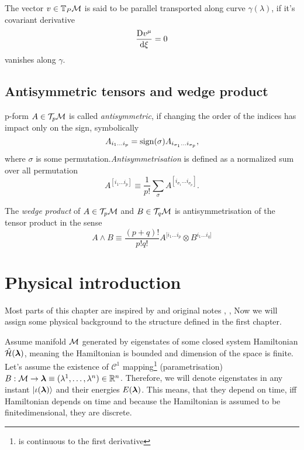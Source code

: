 The vector $v\in \mathbb{T}_P\mathcal{M}$ is said to be parallel transported along curve $\gamma(\lambda)$, if it's covariant derivative
\begin{equation}
    \frac{\mathrm{D} v^\mu}{\mathrm{d} \xi}=0
\end{equation}
vanishes along $\gamma$.

\section{Antisymmetric tensors and wedge product}
p-form $A\in \mathcal{T}_p \mathcal{M}$ is called \emph{antisymmetric}, if changing the order of the indices has impact only on the sign, symbolically
$$A_{i_1\dots i_p} = \operatorname{\textrm{sign}}(\sigma)A_{i_{\sigma_1}\dots i_{\sigma_p}},$$
where $\sigma$ is some permutation.\emph{Antisymmetrisation} is defined as a normalized sum over all permutation
\begin{equation}
    A^{[i_1\dots i_p]}\equiv \frac{1}{p!}\sum_\sigma A^{[i_{\sigma_1}\dots i_{\sigma_p}]}. 
\end{equation}

The \emph{wedge product} of $A\in \mathcal{T}_p \mathcal{M}$ and $B\in \mathcal{T}_q \mathcal{M}$ is antisymmetrisation of the tensor product in the sense
\begin{equation}
    A\wedge B\equiv \frac{(p+q)!}{p!q!} A^{[i_1\dots i_p}\otimes B^{i_1\dots i_q]}
\end{equation}



\chapter{Physical introduction}
Most parts of this chapter are inspired by \citep{kolodrubez} and original notes \citep{berry1984}, \citep{berry1989}, \citep{berry2009}
Now we will assign some physical background to the structure defined in the first chapter.

Assume manifold $\mathcal{M}$ generated by eigenstates of some closed system Hamiltonian $\hat{\mathcal{H}}({\bm\lambda})$, meaning the Hamiltonian is bounded and dimension of the space is finite. Let's assume the existence of $\mathcal{C}^1$ mapping\footnote{is continuous to the first derivative} (parametrisation) $B: \mathcal{M}\rightarrow \bm{{\bm\lambda}}\equiv (\lambda^1,\dots,\lambda^n)\in\mathbb{R}^n$. Therefore, we will denote eigenstates in any instant $\ket{\iota(\bm{{\bm\lambda}})}$ and their energies $E(\bm{{\bm\lambda}})$. This means, that they depend on time, iff Hamiltonian depends on time and because the Hamiltonian is assumed to be finitedimensional, they are discrete.


